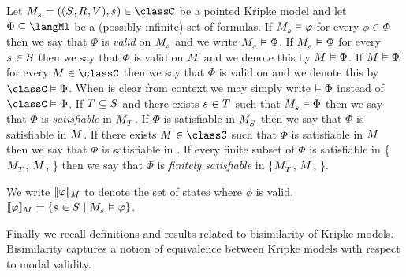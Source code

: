 Let $\pointedModelAndTuple{\stateS} \in \classC$ be a pointed Kripke model and
let $\Phi \subseteq \langMl$ be a (possibly infinite) set of formulas.
If $\pointedModel{\stateS} \entails \phi$ for every $\phi \in \Phi$ then we say that $\Phi$ is {\em valid} on $\pointedModel{\stateS}$ and we write $\pointedModel{\stateS} \entails \Phi$.
If $\pointedModel{\stateS} \entails \Phi$ for every $\stateS \in \states$ then we say that $\Phi$ is valid on $\model$ and we denote this by $\model \entails \Phi$.
If $\model \entails \Phi$ for every $\model \in \classC$ then we say that $\Phi$ is valid on \classC{} and we denote this by $\classC \entails \Phi$.
When \classC{} is clear from context we may simply write $\vDash \Phi$ instead of $\classC \entails \Phi$.
If $\statesT \subseteq \states$ and there exists $\stateS \in \statesT$ such that $\pointedModel{\stateS} \entails \Phi$ then we say that $\Phi$ is {\em satisfiable} in $\pointedModel{\statesT}$.
If $\Phi$ is satisfiable in $\pointedModel{\states}$ then we say that $\Phi$ is satisfiable in $\model$.
If there exists $\model \in \classC$ such that $\Phi$ is satisfiable in $\model$ then we say that $\Phi$ is satisfiable in \classC{}.
If every finite subset of $\Phi$ is satisfiable in \{$\pointedModel{\statesT}$, $\model$, \classC{}\} then we say that $\Phi$ is {\em finitely satisfiable} in \{$\pointedModel{\statesT}$, $\model$, \classC{}\}.

We write $\interpretation[\model]{\phi}$ to denote the set of states where $\phi$ is valid, $\interpretation[\model]{\phi} = \{\stateS \in \states \mid \pointedModel{\stateS} \entails \phi\}$.

Finally we recall definitions and results related to bisimilarity of Kripke models.
Bisimilarity captures a notion of equivalence between Kripke models with respect to modal validity.

